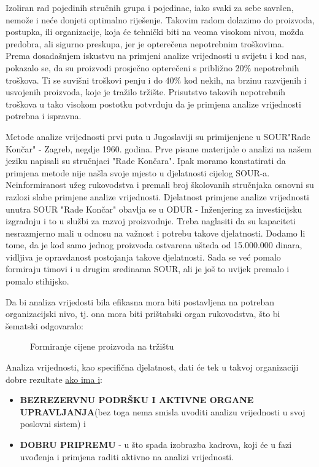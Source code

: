 \documentclass[a4paper,12pt]{article}
\numberwithin{figure}{section}
\begin{document}
Izoliran rad pojedinih stručnih grupa i pojedinac, iako svaki za sebe savršen, nemože i neće donjeti optimalno riješenje. Takovim radom dolazimo do proizvoda, postupka, ili organizacije, koja će tehnički biti na veoma visokom nivou, možda predobra, ali sigurno preskupa, jer je opterečena nepotrebnim troškovima.\\
Prema dosadašnjem iskustvu na primjeni analize vrijednosti u svijetu i kod nas, pokazalo se, da su proizvodi prosječno opterečeni s približno 20\% nepotrebnih troškova. Ti se suvišni troškovi penju i do 40\% kod nekih, na brzinu razvijenih i usvojenih proizvoda, koje je tražilo tržište. Prisutstvo takovih nepotrebnih troškova u tako visokom postotku potvrđuju da je primjena analize vrijednosti potrebna i ispravna.\par
Metode analize vrijednosti prvi puta u Jugoslaviji su primijenjene u SOUR"Rade Končar" - Zagreb, negdje 1960. godina. Prve pisane materijale o analizi na našem jeziku napisali su stručnjaci "Rade Končara". Ipak moramo konstatirati da primjena metode nije našla svoje mjesto u djelatnosti cijelog SOUR-a. Neinformiranost užeg rukovodstva i premali broj školovanih stručnjaka osnovni su razlozi slabe primjene analize vrijednosti. Djelatnost primjene analize vrijednosti unutra SOUR "Rade Končar" obavlja se u ODUR - Inženjering za investicijsku izgradnju i to u službi za razvoj proizvodnje. Treba naglasiti da su kapaciteti nesrazmjerno mali u odnosu na važnost i potrebu takove djelatnosti. Dodamo li tome, da je kod samo jednog proizvoda ostvarena ušteda od 15.000.000 dinara, vidljiva je opravdanost postojanja takove djelatnosti. Sada se već pomalo formiraju timovi i u drugim sredinama SOUR, ali je još to uvijek premalo i pomalo stihijsko. \par
Da bi analiza vrijedosti bila efikasna mora biti postavljena na potreban organizacijski nivo, tj. ona mora biti prištabski organ rukovodstva, što bi šematski odgovaralo:
\begin{figure}
\centering
 
\caption{Formiranje cijene proizvoda na tržištu}\label{Slika1}
\end{figure}
Analiza vrijednosti, kao specifična djelatnost, dati će tek u takvoj organizaciji dobre rezultate \underline{ako ima i}:
\begin{itemize}
\item \textbf{BEZREZERVNU PODRŠKU I AKTIVNE ORGANE UPRAVLJANJA}(bez toga nema smisla uvoditi analizu vrijednosti u svoj poslovni sistem) i
\item \textbf{DOBRU PRIPREMU} - u što spada izobrazba kadrova, koji će u fazi uvođenja i primjena raditi aktivno na analizi vrijednosti.
\end{itemize}
\newpage
\end{document}
